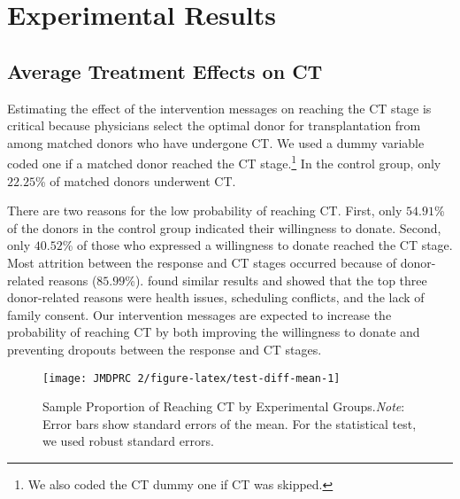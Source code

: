 \documentclass[12pt, a4paper]{article}
\begin{document}
\section{Experimental Results}\label{result}

\subsection{Average Treatment Effects on CT}\label{main}

Estimating the effect of the intervention messages on reaching the CT stage is critical because physicians select the optimal donor for transplantation from among matched donors who have undergone CT. We used a dummy variable coded one if a matched donor reached the CT stage.\footnote{We also coded the CT dummy one if CT was skipped.} In the control group, only \(22.25\)\% of matched donors underwent CT.

There are two reasons for the low probability of reaching CT. First, only \(54.91\)\% of the donors in the control group indicated their willingness to donate. Second, only \(40.52\)\% of those who expressed a willingness to donate reached the CT stage. Most attrition between the response and CT stages occurred because of donor-related reasons (\(85.99\)\%). \citet{Hirakawa2018} found similar results and showed that the top three donor-related reasons were health issues, scheduling conflicts, and the lack of family consent. Our intervention messages are expected to increase the probability of reaching CT by both improving the willingness to donate and preventing dropouts between the response and CT stages.

\begin{figure}[t]
\texttt{[image: JMDPRC~2/figure-latex/test-diff-mean-1]} \caption{Sample Proportion of Reaching CT by Experimental Groups.\newline \emph{Note}: Error bars show standard errors of the mean. For the statistical test, we used robust standard errors.}\label{fig:test-diff-mean}
\end{figure}
\end{document}
